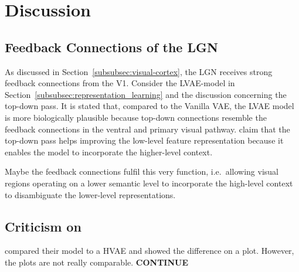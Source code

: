\documentclass[11pt]{article}
\begin{document}
\section{Discussion}\label{sec:discussion}

\subsection{Feedback Connections of the \acl{LGN}}\label{subsec:feedback-connections-of-the-lateral-geniculate-nucleus}

    As discussed in Section~\ref{subsubsec:visual-cortex}, the \ac{LGN} receives strong feedback connections from the \ac{V1}.
    Consider the \ac{LVAE}-model in Section~\ref{subsubsec:representation_learning} and the discussion concerning the top-down pass.
    It is stated that, compared to the Vanilla VAE, the \ac{LVAE} model is more biologically plausible because top-down connections resemble the feedback connections in the ventral and primary visual pathway.
    \citet{sonderby2016ladder} claim that the top-down pass helps improving the low-level feature representation because it enables the model to incorporate the higher-level context.

    Maybe the feedback connections fulfil this very function, i.e.\ allowing visual regions operating on a lower semantic level to incorporate the high-level context to disambiguate the lower-level representations.

    \subsection{Criticism on \citet{zhao2017learning}}

    \citet{zhao2017learning} compared their model to a HVAE and showed the difference on a plot.
    However, the plots are not really comparable.
    \textbf{CONTINUE}
\end{document}
